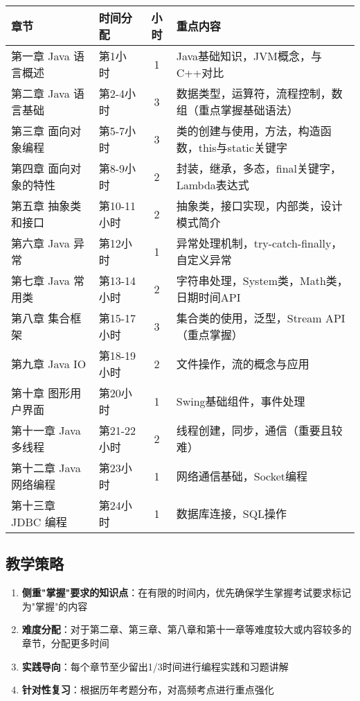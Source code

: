 \documentclass{../note}
\begin{document}
\begin{tabular}{|l|l|c|p{8cm}|}
  \hline
  \textbf{章节} & \textbf{时间分配} & \textbf{小时} & \textbf{重点内容} \\
  \hline
  第一章 Java 语言概述 & 第1小时 & 1 & Java基础知识，JVM概念，与C++对比 \\
  \hline
  第二章 Java 语言基础 & 第2-4小时 & 3 & 数据类型，运算符，流程控制，数组（重点掌握基础语法） \\
  \hline
  第三章 面向对象编程 & 第5-7小时 & 3 & 类的创建与使用，方法，构造函数，this与static关键字 \\
  \hline
  第四章 面向对象的特性 & 第8-9小时 & 2 & 封装，继承，多态，final关键字，Lambda表达式 \\
  \hline
  第五章 抽象类和接口 & 第10-11小时 & 2 & 抽象类，接口实现，内部类，设计模式简介 \\
  \hline
  第六章 Java 异常 & 第12小时 & 1 & 异常处理机制，try-catch-finally，自定义异常 \\
  \hline
  第七章 Java 常用类 & 第13-14小时 & 2 & 字符串处理，System类，Math类，日期时间API \\
  \hline
  第八章 集合框架 & 第15-17小时 & 3 & 集合类的使用，泛型，Stream API（重点掌握） \\
  \hline
  第九章 Java IO & 第18-19小时 & 2 & 文件操作，流的概念与应用 \\
  \hline
  第十章 图形用户界面 & 第20小时 & 1 & Swing基础组件，事件处理 \\
  \hline
  第十一章 Java 多线程 & 第21-22小时 & 2 & 线程创建，同步，通信（重要且较难） \\
  \hline
  第十二章 Java 网络编程 & 第23小时 & 1 & 网络通信基础，Socket编程 \\
  \hline
  第十三章 JDBC 编程 & 第24小时 & 1 & 数据库连接，SQL操作 \\
  \hline
\end{tabular}

\subsection{教学策略}
\begin{enumerate}
  \item \textbf{侧重"掌握"要求的知识点}：在有限的时间内，优先确保学生掌握考试要求标记为"掌握"的内容
  \item \textbf{难度分配}：对于第二章、第三章、第八章和第十一章等难度较大或内容较多的章节，分配更多时间
  \item \textbf{实践导向}：每个章节至少留出1/3时间进行编程实践和习题讲解
  \item \textbf{针对性复习}：根据历年考题分布，对高频考点进行重点强化
\end{enumerate}
\end{document}
